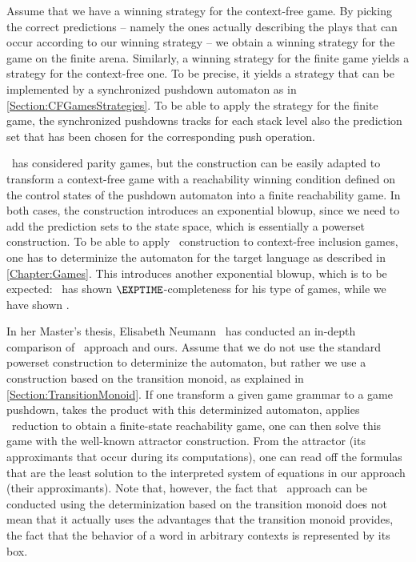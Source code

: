 \documentclass[../../diss.tex]{subfiles}
\begin{document}
Assume that we have a winning strategy for the context-free game.
By picking the correct predictions -- namely the ones actually describing the plays that can occur according to our winning strategy -- we obtain a winning strategy for the game on the finite arena.
Similarly, a winning strategy for the finite game yields a strategy for the context-free one.
To be precise, it yields a strategy that can be implemented by a synchronized pushdown automaton as in \cref{Section:CFGamesStrategies}.
To be able to apply the strategy for the finite game, the synchronized pushdowns tracks for each stack level also the prediction set that has been chosen for the corresponding push operation.

\Walu~has considered parity games, but the construction can be easily adapted to transform a context-free game with a reachability winning condition defined on the control states of the pushdown automaton into a finite reachability game.
In both cases, the construction introduces an exponential blowup, since we need to add the prediction sets to the state space, which is essentially a powerset construction.
To be able to apply \Walus~construction to context-free inclusion games, one has to determinize the automaton for the target language as described in \cref{Chapter:Games}.
This introduces another exponential blowup, which is to be expected: \Walu~has shown $\EXPTIME$-completeness for his type of games, while we have shown .

In her Master's thesis, Elisabeth Neumann~\cite{Neumann17} has conducted an in-depth comparison of \Walus~approach and ours.
Assume that we do not use the standard powerset construction to determinize the automaton, but rather we use a construction based on the transition monoid, as explained in \cref{Section:TransitionMonoid}.
If one transform a given game grammar to a game pushdown, takes the product with this determinized automaton, applies \Walus~reduction to obtain a finite-state reachability game, one can then solve this game with the well-known attractor construction.
From the attractor (\resp its approximants that occur during its computations), one can read off the formulas that are the least solution to the interpreted system of equations in our approach (\resp their approximants).
Note that, however, the fact that \Walus~approach can be conducted using the determinization based on the transition monoid does not mean that it actually uses the advantages that the transition monoid provides, \eg the fact that the behavior of a word in arbitrary contexts is represented by its box.
\end{document}
